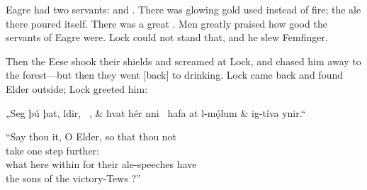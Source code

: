 Eagre had two servants:  and . There was glowing gold used instead of fire; the ale there poured itself. There was a great . Men greatly praised how good the servants of Eagre were. Lock could not stand that, and he slew Femfinger.

Then the Eese shook their shields and screamed at Lock, and chased him away to the forest—but then they went [back] to drinking. Lock came back and found Elder outside; Lock greeted him:\epb\epg

\sectionline

\bvg\bva „Seg þú þat, ldir, \hld\ , &
hvat hér nni \hld\ hafa at l-mǫ́lum &
\ind {}ig-tíva ynir.“\eva

\bvb “Say thou it, O Elder, so that thou not \\
take one step further: \\
what here within for their ale-speeches have \\
the sons of the victory-Tews ?”\evb
\evg


